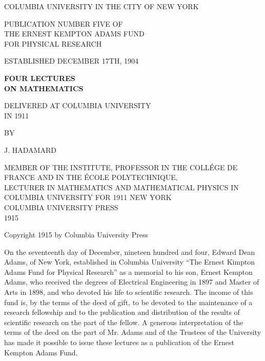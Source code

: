 \documentclass[12pt,oneside]{book}
\begin{document}
\begin{titlepage}
    \centering
    {\large COLUMBIA UNIVERSITY IN THE CITY OF NEW YORK \par}
    {\normalsize PUBLICATION NUMBER FIVE OF\\THE ERNEST KEMPTON ADAMS FUND\\FOR PHYSICAL RESEARCH\par}
    {\normalsize ESTABLISHED DECEMBER 17TH, 1904 \par}
    \vspace*{-\baselineskip}
    \noindent\makebox[\linewidth]{\rule{14cm}{0.4pt}}
    {\Huge \textbf{FOUR LECTURES\\ON MATHEMATICS} \par}
    \vspace{1cm}
    {\large DELIVERED AT COLUMBIA UNIVERSITY\\IN 1911 \par}
    \vspace{2cm}
    {\normalsize BY \par}
    \vspace*{-\baselineskip}
    {\large J. HADAMARD \par}
    \vspace{0.5cm}
    {\tiny MEMBER OF THE INSTITUTE, PROFESSOR IN THE COLL\'EGE DE FRANCE AND IN THE \'ECOLE POLYTECHNIQUE,\\
    LECTURER IN MATHEMATICS AND MATHEMATICAL PHYSICS IN COLUMBIA UNIVERSITY FOR 1911}
    \vfill
    {\large NEW YORK\\COLUMBIA UNIVERSITY PRESS\\1915}
\end{titlepage}

\begin{center}
    Copyright 1915 by Columbia University Press
\end{center}

\pagebreak

On the seventeenth day of December, nineteen hundred and four, Edward Dean
Adams, of New York, established in Columbia University ``The Ernest Kimpton
Adams Fund for Physical Research'' as a memorial to his son, Ernest Kempton
Adams, who received the degrees of Electrical Engineering in 1897 and Master of
Arts in 1898, and who devoted his life to scientific research. The income of
this fund is, by the terms of the deed of gift, to be devoted to the maintenance
of a research fellowship and to the publication and distribution of the results
of scientific research on the part of the fellow. A generous interpretation of
the terms of the deed on the part of Mr. Adams and of the Trustees of the
University has made it possible to issue these lectures as a publication of the
Ernest Kempton Adams Fund. \par \noindent\makebox{\rule{16.5cm}{1pt}}
\end{document}
